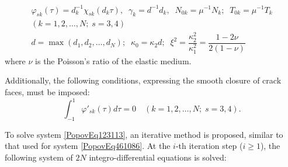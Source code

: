 \[
\begin{array}{l}
	\varphi _{sk} (\tau )=d_{k}^{-1} \chi _{sk} (d_{k} \tau ),\;\; \gamma _{k} =d^{-1} d_{k} ,\;\; N_{0k} =\mu ^{-1} N_{k} ;\;\; T_{0k} =\mu ^{-1} T_{k}
	\\
	(k=1,2,\dots,N;\; s=3,4)
	\\
	d=\max (d_{1} ,d_{2} ,\dots,d_{N} );\;\; \kappa _{0} =\kappa _{2} d;\;\; \xi ^{2} =\dfrac{\kappa _{2}^{2} }{\kappa _{1}^{2} } =\dfrac{1-2\nu }{2(1-\nu )} 
\end{array}
\]
where \( \nu \) is the Poisson’s ratio of the elastic medium.

\noindent Additionally, the following conditions, expressing the smooth closure of crack faces, must be imposed:
\[
\int _{-1}^{1}\varphi '_{sk} (\tau )d\tau =0\quad (k=1, 2,\dots,N;\; s=3,4).
\] 

To solve system \eqref{PopovEq123113}, an iterative method is proposed, similar to that used for system \eqref{PopovEq461086}. At the \( i \)-th iteration step (\( i \ge 1 \)), the following system of \( 2N \) integro-differential equations is solved:

